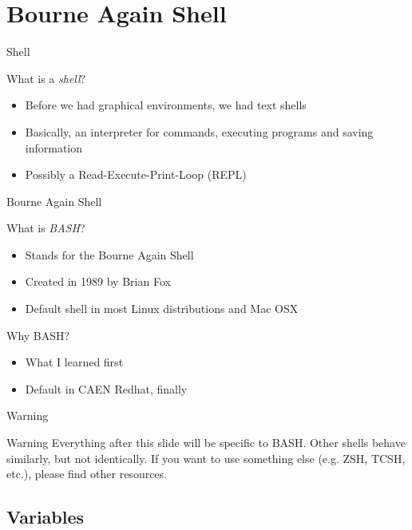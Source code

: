 \documentclass[table,dvipsnames]{beamer}
\begin{document}
\section{Bourne Again Shell}

\begin{frame}{Shell}
	\begin{block}{What is a \emph{shell}?}
		\begin{itemize}
			\item Before we had graphical environments, we had text shells
			\item Basically, an interpreter for commands, executing programs
				and saving information
			\item Possibly a Read-Execute-Print-Loop (REPL)
		\end{itemize}
	\end{block}
\end{frame}

\begin{frame}{Bourne Again Shell}
	\begin{block}{What is \emph{BASH}?}
		\begin{itemize}
			\item Stands for the Bourne Again Shell
			\item Created in 1989 by Brian Fox
			\item Default shell in most Linux distributions and Mac OSX
		\end{itemize}
	\end{block}
	\begin{block}{Why BASH?}
		\begin{itemize}
			\item What I learned first
			\item Default in CAEN Redhat, finally
		\end{itemize}
	\end{block}
\end{frame}

\begin{frame}{Warning}
	\begin{block}{Warning}
		Everything after this slide will be specific to BASH. Other shells
		behave similarly, but not identically. If you want to use something
		else (e.g. ZSH, TCSH, etc.), please find other resources.
	\end{block}
\end{frame}

\subsection{Variables}
\end{document}
